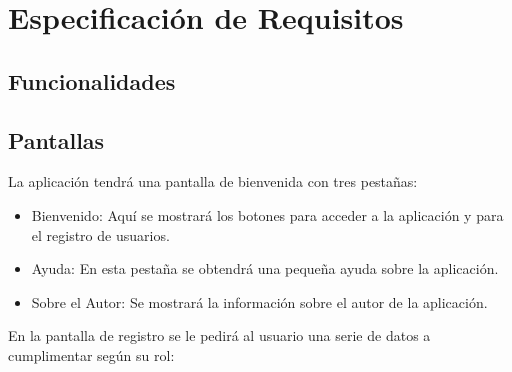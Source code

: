 %
%
%
%

\cleardoublepage
\chapter{Especificación de Requisitos}
\label{chap:requirements}

\section{Funcionalidades}

\section{Pantallas}
La aplicación tendrá una pantalla de bienvenida con tres pestañas:
	\begin{itemize}
		\item Bienvenido: Aquí se mostrará los botones para acceder a la aplicación y para el registro de usuarios.
		\item Ayuda: En esta pestaña se obtendrá una pequeña ayuda sobre la aplicación.
		\item Sobre el Autor: Se mostrará la información sobre el autor de la aplicación.
	\end{itemize}
	En la pantalla de registro se le pedirá al usuario una serie de datos a cumplimentar según su rol: 
